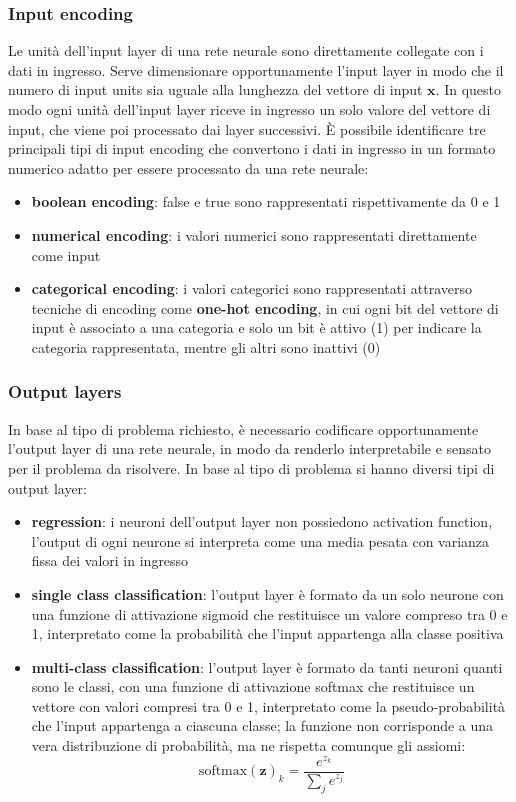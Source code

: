 \subsubsection*{Input encoding}
Le unità dell'input layer di una rete neurale sono direttamente collegate con i dati in ingresso. Serve dimensionare
opportunamente l'input layer in modo che il numero di input units sia uguale alla lunghezza del vettore di input \(\textbf{x}\).
In questo modo ogni unità dell'input layer riceve in ingresso un solo valore del vettore di input, che viene poi processato
dai layer successivi. È possibile identificare tre principali tipi di input encoding che convertono i dati in ingresso in un
formato numerico adatto per essere processato da una rete neurale:
\begin{itemize}
	\item \textbf{boolean encoding}: false e true sono rappresentati rispettivamente da 0 e 1
	\item \textbf{numerical encoding}: i valori numerici sono rappresentati direttamente come input
	\item \textbf{categorical encoding}: i valori categorici sono rappresentati attraverso tecniche di encoding come
	\textbf{one-hot encoding}, in cui ogni bit del vettore di input è associato a una categoria e solo un bit è attivo (1) 
	per indicare la categoria rappresentata, mentre gli altri sono inattivi (0)
\end{itemize}

\subsubsection*{Output layers}
In base al tipo di problema richiesto, è necessario codificare opportunamente l'output layer di una rete neurale, in modo
da renderlo interpretabile e sensato per il problema da risolvere. In base al tipo di problema si hanno diversi tipi di
output layer:
\begin{itemize}
	\item \textbf{regression}: i neuroni dell'output layer non possiedono activation function, l'output
	di ogni neurone si interpreta come una media pesata con varianza fissa dei valori in ingresso
	\item \textbf{single class classification}: l'output layer è formato da un solo neurone con una
	funzione di attivazione sigmoid che restituisce un valore compreso tra 0 e 1, interpretato come la probabilità che
	l'input appartenga alla classe positiva
	\item \textbf{multi-class classification}: l'output layer è formato da tanti neuroni quanti sono
	le classi, con una funzione di attivazione softmax che restituisce un vettore con valori compresi tra 0 e 1, interpretato
	come la pseudo-probabilità che l'input appartenga a ciascuna classe; la funzione non corrisponde a una vera distribuzione
	di probabilità, ma ne rispetta comunque gli assiomi:
	\[\text{softmax}(\textbf{z})_k = \frac{e^{z_k}}{\sum_{j} e^{z_j}}\]
\end{itemize}

